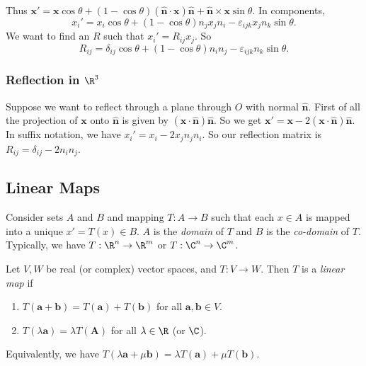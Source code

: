 \documentclass[a4paper]{article}
\begin{document}
Thus $\mathbf{x}' = \mathbf{x}\cos\theta + (1 - \cos\theta)\mathbf{(\hat{n}\cdot x)\hat{n} + \hat{n}\times x}\sin\theta$. In components,
\[
  x_i' = x_i\cos\theta + (1 - \cos\theta)n_jx_jn_i - \varepsilon_{ijk}x_jn_k\sin\theta.
\]
We want to find an $R$ such that $x_i' = R_{ij}x_j$. So
\[
  R_{ij} = \delta_{ij}\cos\theta + (1 - \cos\theta)n_in_j - \varepsilon_{ijk}n_k\sin\theta.
\]

\subsubsection{Reflection in \texorpdfstring{$\R^3$}{R3}}
Suppose we want to reflect through a plane through $O$ with normal $\hat{\mathbf{n}}$. First of all the projection of $\mathbf{x}$ onto $\hat{\mathbf{n}}$ is given by $(\mathbf{x}\cdot \hat{\mathbf{n}})\hat{\mathbf{n}}$. So we get $\mathbf{x}' = \mathbf{x} - 2\mathbf{(x\cdot \hat{n})\hat{n}}$. In suffix notation, we have $x_i' = x_i - 2x_jn_jn_i$. So our reflection matrix is $R_{ij} = \delta_{ij} - 2n_in_j$.
\begin{center}
\end{center}

\subsection{Linear Maps}
\begin{defi}
  Consider sets $A$ and $B$ and mapping $T:A\to B$ such that each $x\in A$ is mapped into a unique $x' = T(x)\in B$. $A$ is the \emph{domain} of $T$ and $B$ is the \emph{co-domain} of $T$. Typically, we have $T:\R^n \to \R^m$ or $T:\C^n\to \C^m$.
\end{defi}

\begin{defi}
  Let $V, W$ be real (or complex) vector spaces, and $T: V\to W$. Then $T$ is a \emph{linear map} if
  \begin{enumerate}
    \item $T(\mathbf{a + b}) = T(\mathbf{a}) + T(\mathbf{b})$ for all $\mathbf{a, b}\in V$.
    \item $T(\lambda\mathbf{a}) = \lambda T(\mathbf{A})$ for all $\lambda \in \R$ (or $\C$).
  \end{enumerate}
  Equivalently, we have $T(\lambda\mathbf{a} + \mu\mathbf{b}) = \lambda T(\mathbf{a}) + \mu T(\mathbf{b})$.
\end{defi}
\end{document}
